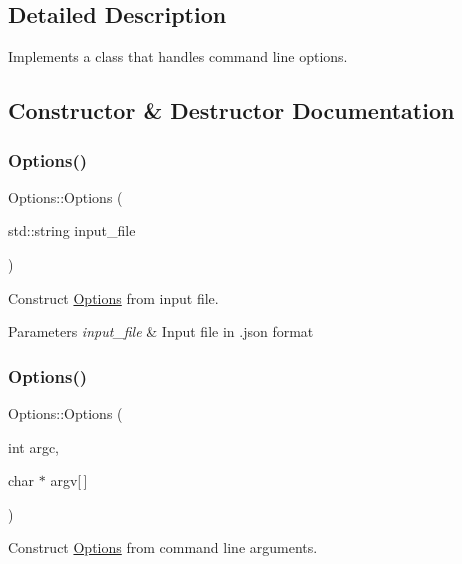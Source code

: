\subsection{Detailed Description}
Implements a class that handles command line options. 

\subsection{Constructor \& Destructor Documentation}
\mbox{\label{classOptions_aa1e7b11260c48cbc4d4c52266c74abf2}} 
\subsubsection{\texorpdfstring{Options()}{Options()}\hspace{0.1cm}{\footnotesize\ttfamily [1/2]}}
{\footnotesize\ttfamily Options\+::\+Options (\begin{DoxyParamCaption}\item[{std\+::string}]{input\+\_\+file }\end{DoxyParamCaption})}



Construct \hyperlink{classOptions}{Options} from input file. 


\begin{DoxyParams}{Parameters}
{\em input\+\_\+file} & Input file in .json format \\
\hline
\end{DoxyParams}
\mbox{\label{classOptions_ab3a4819d972a234777923d85122bcf37}} 
\subsubsection{\texorpdfstring{Options()}{Options()}\hspace{0.1cm}{\footnotesize\ttfamily [2/2]}}
{\footnotesize\ttfamily Options\+::\+Options (\begin{DoxyParamCaption}\item[{int}]{argc,  }\item[{char $\ast$}]{argv\mbox{[}$\,$\mbox{]} }\end{DoxyParamCaption})}



Construct \hyperlink{classOptions}{Options} from command line arguments. 


